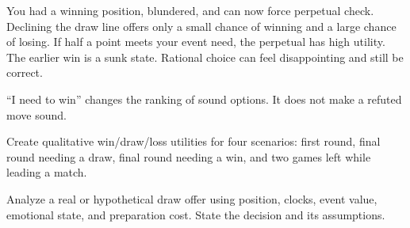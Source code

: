 \begin{workedbox}[title={Worked example: the forced draw you dislike}]
You had a winning position, blundered, and can now force perpetual check. Declining the draw line offers only a small chance of winning and a large chance of losing. If half a point meets your event need, the perpetual has high utility. The earlier win is a sunk state. Rational choice can feel disappointing and still be correct.
\end{workedbox}

\begin{warningbox}
``I need to win'' changes the ranking of sound options. It does not make a refuted move sound.
\end{warningbox}

\begin{exercise}
Create qualitative win/draw/loss utilities for four scenarios: first round, final round needing a draw, final round needing a win, and two games left while leading a match.
\end{exercise}

\begin{exercise}
Analyze a real or hypothetical draw offer using position, clocks, event value, emotional state, and preparation cost. State the decision and its assumptions.
\end{exercise}

